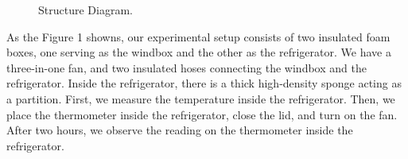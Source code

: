 \documentclass[12pt]{article}
\begin{document}
\begin{figure}[htb]
\centering
{}
\caption{Structure Diagram.}
\end{figure}

As the Figure 1 showns, our experimental setup consists of two insulated foam boxes, one serving as the windbox and the other as the refrigerator. We have a three-in-one fan, and two insulated hoses connecting the windbox and the refrigerator. Inside the refrigerator, there is a thick high-density sponge acting as a partition.
First, we measure the temperature inside the refrigerator. Then, we place the thermometer inside the refrigerator, close the lid, and turn on the fan. After two hours, we observe the reading on the thermometer inside the refrigerator.
\newpage
\end{document}
